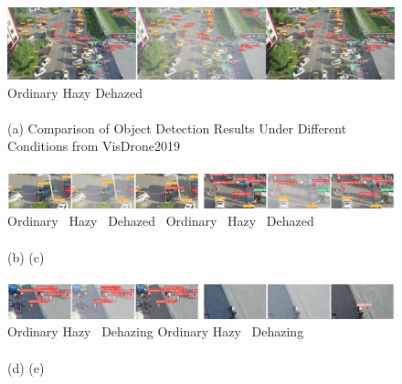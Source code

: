 \documentclass[lettersize,journal]{IEEEtran}
\begin{document}
\begin{figure}[pht]
    \centering    
    \includegraphics[width=\textwidth]{rm_pic2.jpg}
    Ordinary \qquad\qquad\qquad\qquad\qquad\qquad\qquad\quad Hazy \qquad\qquad\qquad\qquad\qquad\qquad\qquad Dehazed \\

    \quad \\
    
    (a) Comparison of Object Detection Results Under Different Conditions from VisDrone2019\\

    \quad \\
    
    \includegraphics[width=\textwidth]{rm_pic3.jpg}
    Ordinary \qquad\qquad\quad\, Hazy \qquad\qquad\quad\ Dehazed 
    \qquad \qquad \,
    Ordinary \qquad\qquad\quad\, Hazy \qquad\qquad\quad\ Dehazed\\

    \quad \\
    
    (b) \qquad\qquad\qquad\qquad\qquad\qquad\qquad\qquad\qquad\qquad\qquad\qquad\quad (c) \\

    \quad \\

    \includegraphics[width=\textwidth]{rm_pic4.jpg}
    Ordinary \qquad\qquad\quad Hazy \qquad\qquad\quad\ Dehazing 
    \qquad \qquad \quad
    Ordinary \qquad\qquad\quad Hazy \qquad\qquad\quad\ Dehazing\\
    
    \quad \\
    
    (d) \qquad\qquad\qquad\qquad\qquad\qquad\qquad\qquad\qquad\qquad\qquad\qquad\quad (e) \\

    \quad \\
    

\end{figure}
\end{document}
